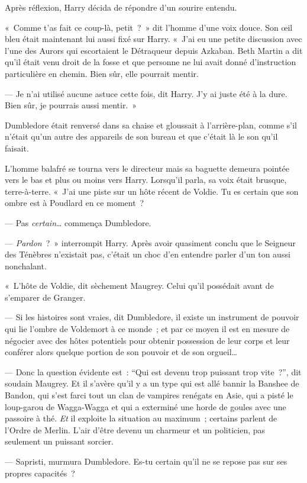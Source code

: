 Après réflexion, Harry décida de répondre d'un sourire entendu.

«~Comme t'as fait ce coup-là, petit~?~» dit l'homme d'une voix douce. Son œil bleu était maintenant lui aussi fixé sur Harry. «~J'ai eu une petite discussion avec l'une des Aurors qui escortaient le Détraqueur depuis Azkaban. Beth Martin a dit qu'il était venu droit de la fosse et que personne ne lui avait donné d'instruction particulière en chemin. Bien sûr, elle pourrait mentir.

--- Je n'ai utilisé aucune astuce cette fois, dit Harry. J'y ai juste été à la dure. Bien sûr, je pourrais aussi mentir.~»

Dumbledore était renversé dans sa chaise et gloussait à l'arrière-plan, comme s'il n'était qu'un autre des appareils de son bureau et que c'était là le son qu'il faisait.

L'homme balafré se tourna vers le directeur mais sa baguette demeura pointée vers le bas et plus ou moins vers Harry. Lorsqu'il parla, sa voix était brusque, terre-à-terre. «~J'ai une piste sur un hôte récent de Voldie. Tu es certain que son ombre est à Poudlard en ce moment~?

--- Pas \emph{certain}… commença Dumbledore.

--- \emph{Pardon}~?~» interrompit Harry. Après avoir quasiment conclu que le Seigneur des Ténèbres n'existait pas, c'était un choc d'en entendre parler d'un ton aussi nonchalant.

«~L'hôte de Voldie, dit sèchement Maugrey. Celui qu'il possédait avant de s'emparer de Granger.

--- Si les histoires sont vraies, dit Dumbledore, il existe un instrument de pouvoir qui lie l'ombre de Voldemort à ce monde~; et par ce moyen il est en mesure de négocier avec des hôtes potentiels pour obtenir possession de leur corps et leur conférer alors quelque portion de son pouvoir et de son orgueil…

--- Donc la question évidente est~: “Qui est devenu trop puissant trop vite~?”, dit soudain Maugrey. Et il s'avère qu'il y a un type qui est allé bannir la Banshee de Bandon, qui s'est farci tout un clan de vampires renégats en Asie, qui a pisté le loup-garou de Wagga-Wagga et qui a exterminé une horde de goules avec une passoire à thé. \emph{Et} il exploite la situation au maximum~; certains parlent de l'Ordre de Merlin. L'air d'être devenu un charmeur et un politicien, pas seulement un puissant sorcier.

--- Sapristi, murmura Dumbledore. Es-tu certain qu'il ne se repose pas sur ses propres capacités~?

